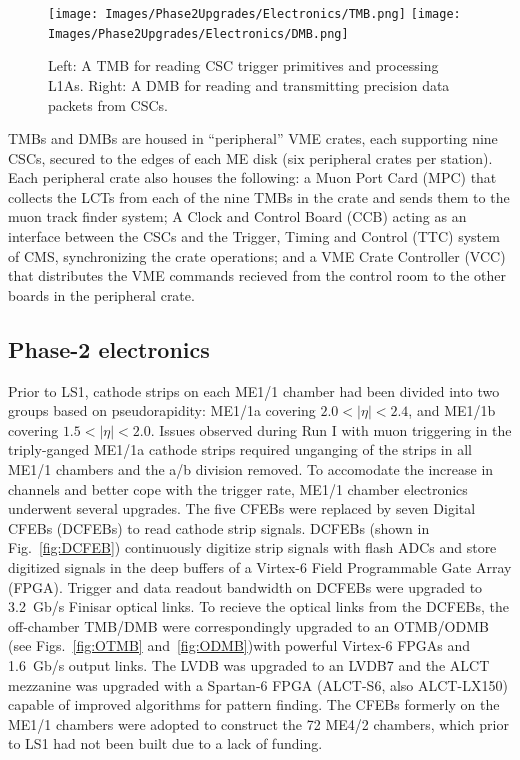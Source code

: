 \begin{figure}[H]
    \centering
    \texttt{[image: Images/Phase2Upgrades/Electronics/TMB.png]}
    \texttt{[image: Images/Phase2Upgrades/Electronics/DMB.png]}
    \caption{Left: A TMB for reading CSC trigger primitives and processing L1As. Right: A DMB for reading and transmitting precision data packets from CSCs.}
    \label{fig:TMBDMB}
\end{figure}

TMBs and DMBs are housed in ``peripheral'' VME crates, each supporting nine CSCs, secured to the edges of each ME disk (six peripheral crates per station). Each peripheral crate also houses the following: a Muon Port Card (MPC) that collects the LCTs from each of the nine TMBs in the crate and sends them to the muon track finder system; A Clock and Control Board (CCB) acting as an interface between the CSCs and the Trigger, Timing and Control (TTC) system of CMS, synchronizing the crate operations; and a VME Crate Controller (VCC) that distributes the VME commands recieved from the control room to the other boards in the peripheral crate.

\subsection{Phase-2 electronics} \label{sec:Phase2CSCelectronics}

Prior to LS1, cathode strips on each ME1/1 chamber had been divided into two groups based on pseudorapidity: ME1/1a covering $2.0 < |\eta|< 2.4$, and ME1/1b covering $1.5 < |\eta| < 2.0$. Issues observed during Run I with muon triggering in the triply-ganged ME1/1a cathode strips required unganging of the strips in all ME1/1 chambers and the a/b division removed. To accomodate the increase in channels and better cope with the trigger rate, ME1/1 chamber electronics underwent several upgrades. The five CFEBs were replaced by seven Digital CFEBs (DCFEBs) to read cathode strip signals. DCFEBs (shown in Fig.~\ref{fig:DCFEB}) continuously digitize strip signals with flash ADCs and store digitized signals in the deep buffers of a Virtex-6 Field Programmable Gate Array (FPGA). Trigger and data readout bandwidth on DCFEBs were upgraded to \SI{3.2}{Gb/s} Finisar optical links. To recieve the optical links from the DCFEBs, the off-chamber TMB/DMB were correspondingly upgraded to an OTMB/ODMB (see Figs.~\ref{fig:OTMB} and~\ref{fig:ODMB})with powerful Virtex-6 FPGAs and \SI{1.6}{Gb/s} output links. The LVDB was upgraded to an LVDB7 and the ALCT mezzanine was upgraded with a Spartan-6 FPGA (ALCT-S6, also ALCT-LX150) capable of improved algorithms for pattern finding. The CFEBs formerly on the ME1/1 chambers were adopted to construct the 72 ME4/2 chambers, which prior to LS1 had not been built due to a lack of funding.

